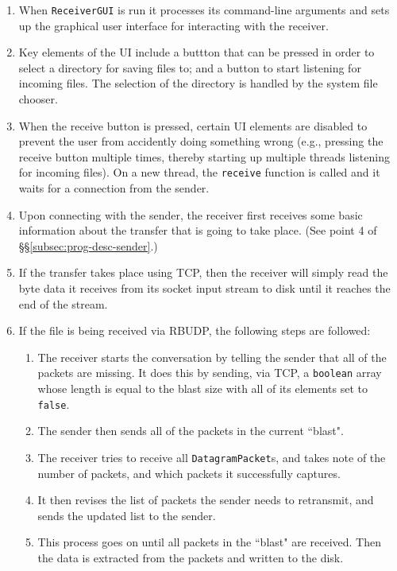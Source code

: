\documentclass[10pt, a4paper]{article}
\begin{document}
\begin{enumerate}
  \item When \texttt{ReceiverGUI} is run it processes its command-line arguments
    and sets up the graphical user interface for interacting with the receiver.
  \item Key elements of the UI include a buttton that can be pressed in order
    to select a directory for saving files to; and a button to start listening
    for incoming files. The selection of the directory is handled by the system
    file chooser.
  \item When the receive button is pressed, certain UI elements are disabled to
    prevent the user from accidently doing something wrong (e.g., pressing the
    receive button multiple times, thereby starting up multiple threads
    listening for incoming files). On a new thread, the \texttt{receive}
    function is called and it waits for a connection from the sender.
  \item Upon connecting with the sender, the receiver first receives some basic
    information about the transfer that is going to take place. (See point 4
    of \S\S\ref{subsec:prog-desc-sender}.)
  \item If the transfer takes place using TCP, then the receiver will simply
    read the byte data it receives from its socket input stream to disk until it
    reaches the end of the stream.
  \item If the file is being received via RBUDP, the following steps are
    followed:
    \begin{enumerate}
      \item The receiver starts the conversation by telling the sender that
        all of the packets are missing. It does this by sending, via TCP, a
        \texttt{boolean} array whose length is equal to the blast size with
        all of its elements set to \texttt{false}.
      \item The sender then sends all of the packets in the current ``blast".
      \item The receiver tries to receive all \texttt{DatagramPacket}s, and
        takes note of the number of packets, and which packets it successfully
        captures.
      \item It then revises the list of packets the sender needs to retransmit,
        and sends the updated list to the sender.
      \item This process goes on until all packets in the ``blast" are received.
        Then the data is extracted from the packets and written to the disk.

\end{enumerate}
\end{enumerate}
\end{document}

